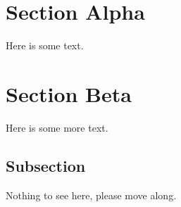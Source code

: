 \documentclass{article}
\begin{document}
\section{Section Alpha}

Here is some text.

\section{Section Beta}

Here is some more text.

\subsection{Subsection}

Nothing to see here, please move along.
\end{document}
